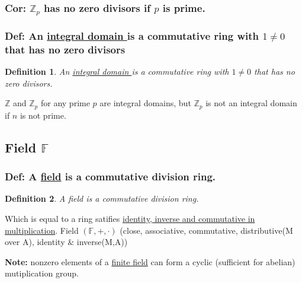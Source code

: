 \documentclass[11pt,a4paper]{article}
\newtheorem{definition}{Definition}
\begin{document}
\subsubsection{Cor: $\mathbb{Z}_p$ has no zero divisors if $p$ is prime.}

\subsubsection{Def: An \underline{integral domain
} is a commutative ring with $1\neq 0$ that has no zero divisors}
\begin{definition}
    An \underline{integral domain
    } is a commutative ring with $1\neq 0$ that has no zero divisors.
\end{definition}
$\mathbb{Z}$ and $\mathbb{Z}_p$ for any prime $p$ are integral domains, but $\mathbb{Z}_p$ is not an integral domain if $n$ is not prime.

\subsection{Field $\mathbb{F}$}
\subsubsection{Def: A \underline{field} is a commutative division ring.}
\begin{definition}
    A field is a commutative division ring.
\end{definition}
Which is equal to a ring satifies \underline{identity, inverse and commutative in multiplication}.
Field $(\mathbb{F}, +, \cdot)$ (close, associative, commutative, distributive(M over A), identity $\&$ inverse(M,A))

\textbf{Note:} nonzero elements of a \underline{finite field} can form a cyclic (sufficient for abelian) mutiplication group.
\end{document}
